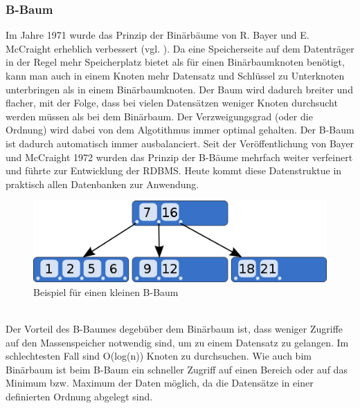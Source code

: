 \subsubsection{B-Baum}
Im Jahre 1971 wurde das Prinzip der Binärbäume von R. Bayer und E. McCraight erheblich verbessert (vgl. \cite{Bayer1972}).
Da eine Speicherseite auf dem Datenträger in der Regel mehr Speicherplatz bietet als für einen Binärbaumknoten benötigt, kann man auch in einem Knoten mehr Datensatz und Schlüssel zu Unterknoten unterbringen als in einem Binärbaumknoten. Der Baum wird dadurch breiter und flacher, mit der Folge, dass bei vielen Datensätzen weniger Knoten durchsucht werden müssen als bei dem Binärbaum. Der Verzweigungsgrad (oder die Ordnung) wird dabei von dem Algotithmus immer optimal gehalten. Der B-Baum ist dadurch automatisch immer ausbalanciert. Seit der Veröffentlichung von Bayer und McCraight 1972 wurden das Prinzip der B-Bäume mehrfach weiter verfeinert und führte zur Entwicklung der RDBMS. Heute kommt diese Datenstruktue in praktisch allen Datenbanken zur Anwendung.\\
\begin{figure}[h]
\includegraphics[width=.85\textwidth]{img/B-tree.png}
\caption{Beispiel für einen kleinen B-Baum}
\label{bbaum}
\end{figure}
\\Der Vorteil des B-Baumes degebüber dem Binärbaum ist, dass weniger Zugriffe auf den Massenspeicher notwendig sind, um zu einem Datensatz zu gelangen. Im schlechtesten Fall sind O(log(n)) Knoten zu durchsuchen. Wie auch bim Binärbaum ist beim B-Baum ein schneller Zugriff auf einen Bereich oder auf das Minimum bzw. Maximum der Daten möglich, da die Datensätze in einer definierten Ordnung abgelegt sind.

